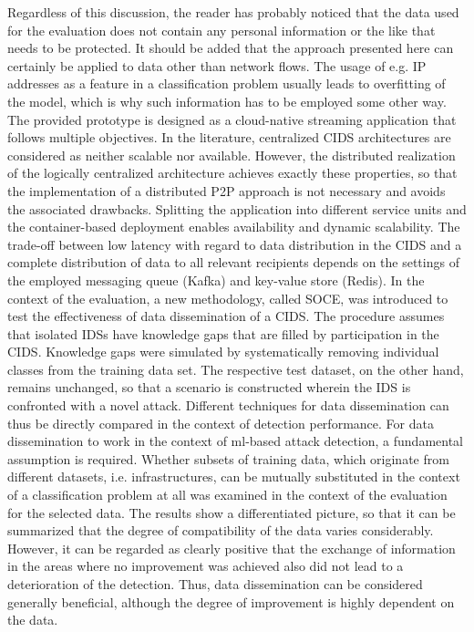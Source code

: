 \documentclass[../../main.tex]{subfiles}
\begin{document}
Regardless of this discussion, the reader has probably noticed that the data used for the evaluation does not contain any personal information or the like that needs to be protected. It should be added that the approach presented here can certainly be applied to data other than network flows. The usage of e.g. IP addresses as a feature in a classification problem usually leads to overfitting of the model, which is why such information has to be employed some other way. The provided prototype is designed as a cloud-native streaming application that follows multiple objectives. In the literature, centralized CIDS architectures are considered as neither scalable nor available. However, the distributed realization of the logically centralized architecture achieves exactly these properties, so that the implementation of a distributed P2P approach is not necessary and avoids the associated drawbacks. Splitting the application into different service units and the container-based deployment enables availability and dynamic scalability. The trade-off between low latency with regard to data distribution in the CIDS and a complete distribution of data to all relevant recipients depends on the settings of the employed messaging queue (Kafka) and key-value store (Redis). In the context of the evaluation, a new methodology, called SOCE, was introduced to test the effectiveness of data dissemination of a CIDS. The procedure assumes that isolated IDSs have knowledge gaps that are filled by participation in the CIDS. Knowledge gaps were simulated by systematically removing individual classes from the training data set. The respective test dataset, on the other hand, remains unchanged, so that a scenario is constructed wherein the IDS is confronted with a novel attack. Different techniques for data dissemination can thus be directly compared in the context of detection performance. For data dissemination to work in the context of \gls{ml}-based attack detection, a fundamental assumption is required. Whether subsets of training data, which originate from different datasets, i.e. infrastructures, can be mutually substituted in the context of a classification problem at all was examined in the context of the evaluation for the selected data. The results show a differentiated picture, so that it can be summarized that the degree of compatibility of the data varies considerably. However, it can be regarded as clearly positive that the exchange of information in the areas where no improvement was achieved also did not lead to a deterioration of the detection. Thus, data dissemination can be considered generally beneficial, although the degree of improvement is highly dependent on the data.  
\end{document}
